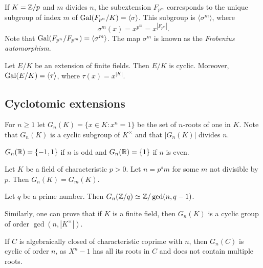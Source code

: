 If $K=\mathbb{Z}/p$ and 
$m$ divides $n$, the subextension $F_{p^m}$ corresponds 
to the unique
subgroup of index $m$ of $\operatorname{Gal}(F_{p^n}/K)=\langle\sigma\rangle$. This subgroup
is $\langle\sigma^m\rangle$, where
\[
\sigma^m(x)=x^{p^m}=x^{|F_{p^m}|}.
\]
Note that $\operatorname{Gal}(F_{p^n}/F_{p^m})=\langle\sigma^m\rangle$. 
The map $\sigma^m$ is known as 
the \emph{Frobenius automorphism}. 

\begin{exercise}
    Let $E/K$ be an extension of finite fields. Then $E/K$ 
    is cyclic. Moreover, $\operatorname{Gal}(E/K)=\langle\tau\rangle$, where $\tau(x)=x^{|K|}$. 
\end{exercise}




\subsection{Cyclotomic extensions}

For $n\geq1$ let $G_n(K)=\{x\in K:x^n=1\}$ be the 
set of $n$-roots of one in $K$. Note that
$G_n(K)$ is a cyclic subgroup of $K^{\times}$ and that 
$|G_n(K)|$ divides $n$. 

\begin{example}
    $G_n(\mathbb{R})=\{-1,1\}$ if $n$ is odd and $G_{n}(\mathbb{R})=\{1\}$ if $n$ is even.
\end{example}

\begin{exercise}
    Let $K$ be a field of characteristic $p>0$. Let $n=p^sm$ for some $m$ not divisible by $p$. 
    Then $G_n(K)=G_m(K)$. 
\end{exercise}

\begin{exercise}
    Let $q$ be a prime number. Then $G_n(\mathbb{Z}/q)\simeq\mathbb{Z}/\gcd(n,q-1)$. 
\end{exercise}

Similarly, one can prove that if $K$ is a finite field, then $G_n(K)$ is a cyclic group
of order $\gcd(n,|K^{\times}|)$. 

\begin{example}
    If $C$ is algebraically closed of characteristic coprime with $n$, 
    then $G_n(C)$ is cyclic of order $n$, as $X^n-1$ 
    has all its roots in $C$ and does not contain multiple roots. 
\end{example}

